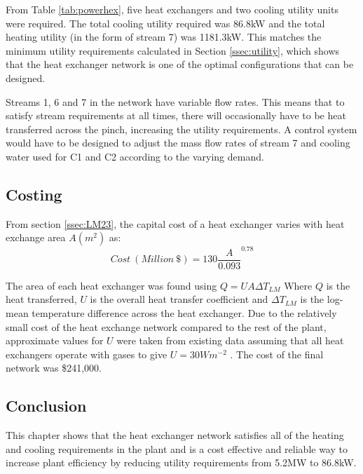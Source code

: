 \documentclass[11pt, oneside]{article}
\begin{document}
From Table \ref{tab:powerhex}, five heat exchangers and two cooling utility units were required. The total cooling utility required was 86.8kW and the total heating utility (in the form of stream 7) was 1181.3kW. This matches the minimum utility requirements calculated in Section \ref{ssec:utility}, which shows that the heat exchanger network is one of the optimal configurations that can be designed.

Streams 1, 6 and 7 in the network have variable flow rates. This means that to satisfy stream requirements at all times, there will occasionally have to be heat transferred across the pinch, increasing the utility requirements. A control system would have to be designed to adjust the mass flow rates of stream 7 and cooling water used for C1 and C2 according to the varying demand.

\subsection{Costing}
From section \ref{ssec:LM23}, the capital cost of a heat exchanger varies with heat exchange area $A (m^2)$ as:
\setlength{\belowdisplayskip}{1pt} \setlength{\belowdisplayshortskip}{1pt}
\setlength{\abovedisplayskip}{1pt} \setlength{\abovedisplayshortskip}{1pt}
\begin{equation} 
Cost \ (Million\ \$) = 130 \frac{A}{0.093}^{0.78}
\end{equation}

The area of each heat exchanger was found using $Q = UA\Delta T_{LM}$
Where $Q$ is the heat transferred, $U$ is the overall heat transfer coefficient and $\Delta T_{LM}$ is the log-mean temperature difference across the heat exchanger. Due to the relatively small cost of the heat exchange network compared to the rest of the plant, approximate values for $U$ were taken from existing data assuming that all heat exchangers operate with gases to give $U=30Wm^{-2}$ \cite{hexcoeff}. The cost of the final network was \$241,000. 

\subsection{Conclusion}
This chapter shows that the heat exchanger network satisfies all of the heating and cooling requirements in the plant and is a cost effective and reliable way to increase plant efficiency by reducing utility requirements from 5.2MW to 86.8kW.


%

\end{document}
